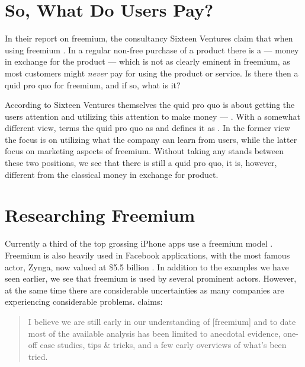 \section{So, What Do Users Pay?}
\label{section:context:what}

In their report on freemium, the consultancy Sixteen Ventures claim that when using freemium  \citep[]{murphy2010}. In a regular non-free purchase of a product there is a  --- money in exchange for the product --- which is not as clearly eminent in freemium, as most customers might \emph{never} pay for using the product or service. Is there then a quid pro quo for freemium, and if so, what is it?

According to Sixteen Ventures themselves the quid pro quo is about getting the users attention and utilizing this attention to make money ---  \citep[]{murphy2010}. With a somewhat different view, \citet{pujol2010} terms the quid pro quo as  and defines it as  \citep[]{pujol2010}. In the former view the focus is on utilizing what the company can learn from users, while the latter focus on marketing aspects of freemium. Without taking any stands between these two positions, we see that there is still a quid pro quo, it is, however, different from the classical money in exchange for product.

\section{Researching Freemium}

Currently a third of the top grossing iPhone apps use a freemium model \citep{kim2010}. Freemium is also heavily used in Facebook applications, with the most famous actor, Zynga, now valued at \$5.5 billion  \citep{morris2010}. In addition to the examples we have seen earlier, we see that freemium is used by several prominent actors. However, at the same time there are considerable uncertainties as many companies are experiencing considerable problems. \citet{rekhi2010} claims:

\begin{quote}
I believe we are still early in our understanding of [freemium] and to date most of the available analysis has been limited to anecdotal evidence, one-off case studies, tips \& tricks, and a few early overviews of what's been tried.
\end{quote}

